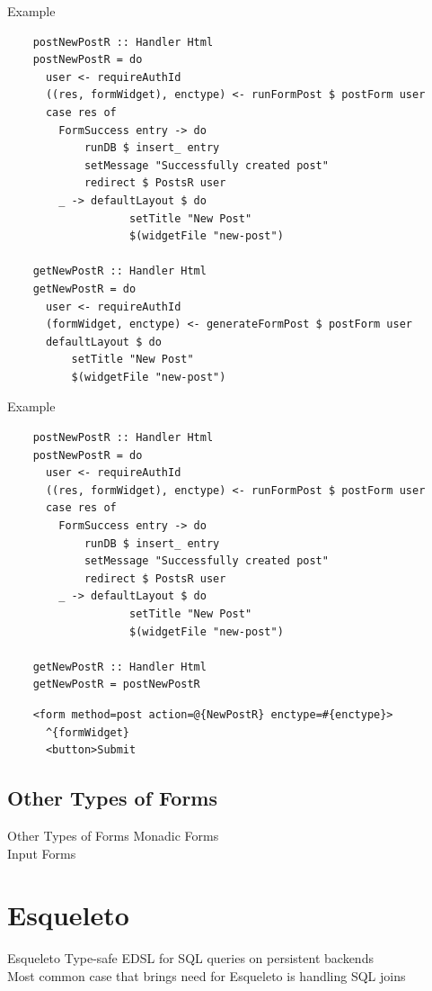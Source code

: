\documentclass[pdf]{beamer}
\begin{document}
\begin{frame}[fragile]{Example}
  \begin{verbatim}
    postNewPostR :: Handler Html
    postNewPostR = do
      user <- requireAuthId
      ((res, formWidget), enctype) <- runFormPost $ postForm user
      case res of
        FormSuccess entry -> do
            runDB $ insert_ entry
            setMessage "Successfully created post"
            redirect $ PostsR user
        _ -> defaultLayout $ do
                   setTitle "New Post"
                   $(widgetFile "new-post")

    getNewPostR :: Handler Html
    getNewPostR = do
      user <- requireAuthId
      (formWidget, enctype) <- generateFormPost $ postForm user
      defaultLayout $ do
          setTitle "New Post"
          $(widgetFile "new-post")      
  \end{verbatim}
\end{frame}

\begin{frame}[fragile]{Example}
  \begin{verbatim}
    postNewPostR :: Handler Html
    postNewPostR = do
      user <- requireAuthId
      ((res, formWidget), enctype) <- runFormPost $ postForm user
      case res of
        FormSuccess entry -> do
            runDB $ insert_ entry
            setMessage "Successfully created post"
            redirect $ PostsR user
        _ -> defaultLayout $ do
                   setTitle "New Post"
                   $(widgetFile "new-post")
    
    getNewPostR :: Handler Html
    getNewPostR = postNewPostR
  \end{verbatim}
  \pause
  \begin{verbatim}
    <form method=post action=@{NewPostR} enctype=#{enctype}>
      ^{formWidget}
      <button>Submit
  \end{verbatim}
\end{frame}

\subsection{Other Types of Forms}
\begin{frame}{Other Types of Forms}
  Monadic Forms\\
  Input Forms\\
\end{frame}

\section{Esqueleto}
\begin{frame}{Esqueleto}
  Type-safe EDSL for SQL queries on persistent backends\\
  Most common case that brings need for Esqueleto is handling SQL joins\\
\end{frame}
\end{document}
